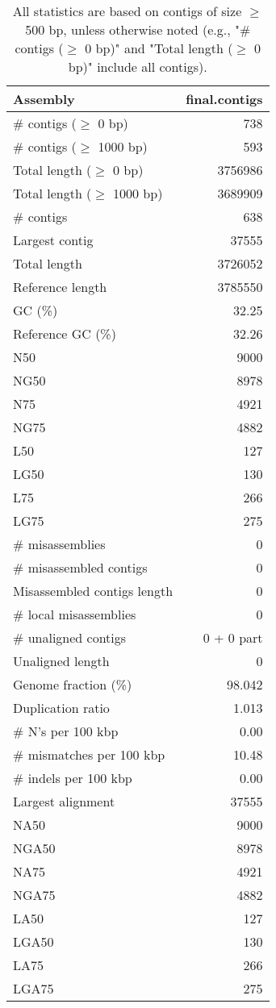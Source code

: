 \documentclass[12pt,a4paper]{article}
\begin{document}
\begin{table}[ht]
\begin{center}
\caption{All statistics are based on contigs of size $\geq$ 500 bp, unless otherwise noted (e.g., "\# contigs ($\geq$ 0 bp)" and "Total length ($\geq$ 0 bp)" include all contigs).}
\begin{tabular}{|l*{1}{|r}|}
\hline
Assembly & final.contigs \\ \hline
\# contigs ($\geq$ 0 bp) & 738 \\ \hline
\# contigs ($\geq$ 1000 bp) & 593 \\ \hline
Total length ($\geq$ 0 bp) & 3756986 \\ \hline
Total length ($\geq$ 1000 bp) & 3689909 \\ \hline
\# contigs & 638 \\ \hline
Largest contig & 37555 \\ \hline
Total length & 3726052 \\ \hline
Reference length & 3785550 \\ \hline
GC (\%) & 32.25 \\ \hline
Reference GC (\%) & 32.26 \\ \hline
N50 & 9000 \\ \hline
NG50 & 8978 \\ \hline
N75 & 4921 \\ \hline
NG75 & 4882 \\ \hline
L50 & 127 \\ \hline
LG50 & 130 \\ \hline
L75 & 266 \\ \hline
LG75 & 275 \\ \hline
\# misassemblies & 0 \\ \hline
\# misassembled contigs & 0 \\ \hline
Misassembled contigs length & 0 \\ \hline
\# local misassemblies & 0 \\ \hline
\# unaligned contigs & 0 + 0 part \\ \hline
Unaligned length & 0 \\ \hline
Genome fraction (\%) & 98.042 \\ \hline
Duplication ratio & 1.013 \\ \hline
\# N's per 100 kbp & 0.00 \\ \hline
\# mismatches per 100 kbp & 10.48 \\ \hline
\# indels per 100 kbp & 0.00 \\ \hline
Largest alignment & 37555 \\ \hline
NA50 & 9000 \\ \hline
NGA50 & 8978 \\ \hline
NA75 & 4921 \\ \hline
NGA75 & 4882 \\ \hline
LA50 & 127 \\ \hline
LGA50 & 130 \\ \hline
LA75 & 266 \\ \hline
LGA75 & 275 \\ \hline
\end{tabular}
\end{center}
\end{table}
\end{document}
